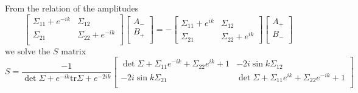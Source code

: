 \documentclass{article}
\begin{document}
From the relation of the amplitudes
\begin{equation}
\begin{bmatrix}
\Sigma_{11} + e^{-ik} & \Sigma_{12} \\
\Sigma_{21} & \Sigma_{22}  + e^{-ik}  \\
\end{bmatrix}
\begin{bmatrix}
A_{-} \\
B_{+}\\
\end{bmatrix}
=-
\begin{bmatrix}
\Sigma_{11} +e^{ik} & \Sigma_{12}\\
\Sigma_{21} & \Sigma_{22} + e^{ik}
\end{bmatrix}
\begin{bmatrix}
A_{+}\\
B_{-}\\
\end{bmatrix}
\end{equation}
we solve the $S$ matrix
\begin{equation}
  S = \frac{-1}{ \det \Sigma  + e^{-ik} \text{tr} \Sigma   + e^{-2ik}}
\begin{bmatrix}
\det \Sigma+ \Sigma_{11} e^{-ik} + \Sigma_{22} e^{ik}+1  & -2i \sin k \Sigma_{12}  \\
-2i \sin k \Sigma_{21} &  \det \Sigma+ \Sigma_{11} e^{ik} + \Sigma_{22} e^{-ik}+1\\
\end{bmatrix}
\end{equation}
\end{document}
